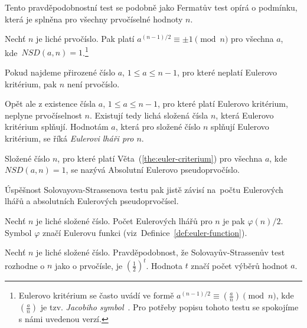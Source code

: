 \documentclass[
  program=infoi,
  biblatex=false,
  figures=true,
  glossaries,
  tables=false,
  sourcecodes=true,
  index
]{kidiplom}
\begin{document}
            Tento pravděpodobnostní test se podobně jako Fermatův test opírá o podmínku, která
            je splněna pro všechny prvočíselné hodnoty $n$.

            \begin{theorem}\label{the:euler-criterium}
                Nechť $n$ je liché prvočíslo.
                Pak platí $a^{(n-1)/2} \equiv \pm 1 \pmod{n}$ pro všechna $a$, kde~$NSD(a,n) = 1$.\footnote{Eulerovo kritérium
                se často uvádí ve formě $a^{(n-1)/2} \equiv \left(\frac{a}{n}\right) \pmod{n}$, kde $\left(\frac{a}{n}\right)$ je tzv.
                \emph{Jacobiho symbol}~\cite{handbook}.
                Pro potřeby popisu tohoto testu se spokojíme s námi uvedenou verzí.}
            \end{theorem}

            Pokud najdeme přirozené číslo $a$, $1 \leq a \leq n-1$, pro které neplatí Eulerovo kritérium, pak
            $n$ není prvočíslo.

            Opět ale z existence čísla $a$, $1 \leq a \leq n-1$, pro které platí Eulerovo kritérium,
            neplyne prvočíselnost $n$.
            Existují tedy lichá složená čísla $n$, která Eulerovo kritérium splňují.
            Hodnotám $a$, která pro složené číslo $n$ splňují Eulerovo kritérium, se říká
            \emph{Eulerovi lháři pro $n$}.

            \begin{definition}
                Složené číslo $n$, pro které platí Věta~(\ref{the:euler-criterium}) pro všechna $a$, kde $NSD(a,n) = 1$, se
                nazývá Absolutní Eulerovo pseudoprvočíslo.
            \end{definition}

            Úspěšnost Solovayova-Strassenova testu pak jistě závisí na~počtu Eulerových lhářů a absolutních Eulerových pseudoprvočísel.

            \begin{theorem}\label{the:euler-liars-count}
                Nechť $n$ je liché složené číslo.
                Počet Eulerových lhářů pro $n$ je pak $\varphi{(n)}/2$.
                Symbol $\varphi$ značí Eulerovu funkci (viz~Definice~\ref{def:euler-function}).
            \end{theorem}

            \begin{theorem}
                Nechť $n$ je liché složené číslo.
                Pravděpodobnost, že Solovayův-Strassenův test rozhodne o $n$ jako o prvočísle, je $\left(\frac{1}{2}\right)^t$.
                Hodnota $t$ značí počet výběrů hodnot $a$. 
            \end{theorem}
\end{document}
